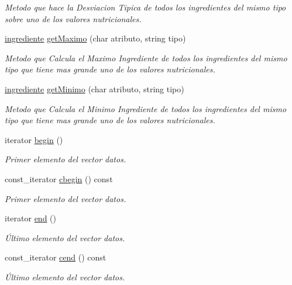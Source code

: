 \begin{DoxyCompactItemize}
\begin{DoxyCompactList}\small\item\em Metodo que hace la Desviacion Tipica de todos los ingredientes del mismo tipo sobre uno de los valores nutricionales. \end{DoxyCompactList}\item 
\hyperlink{classingrediente}{ingrediente} \hyperlink{classingredientes_a6e4cfe264fddd851ccf2f2061d6b66ce}{get\+Maximo} (char atributo, string tipo)
\begin{DoxyCompactList}\small\item\em Metodo que Calcula el Maximo Ingrediente de todos los ingredientes del mismo tipo que tiene mas grande uno de los valores nutricionales. \end{DoxyCompactList}\item 
\hyperlink{classingrediente}{ingrediente} \hyperlink{classingredientes_a0ec4fb15cad1b31709b24751abdf2067}{get\+Minimo} (char atributo, string tipo)
\begin{DoxyCompactList}\small\item\em Metodo que Calcula el Minimo Ingrediente de todos los ingredientes del mismo tipo que tiene mas grande uno de los valores nutricionales. \end{DoxyCompactList}\item 
iterator \hyperlink{classingredientes_a9d61c6347e216b9f99264982ad8e6074}{begin} ()
\begin{DoxyCompactList}\small\item\em Primer elemento del vector datos. \end{DoxyCompactList}\item 
const\+\_\+iterator \hyperlink{classingredientes_a40fdccf1fc4542ea0774a79cfc83e070}{cbegin} () const
\begin{DoxyCompactList}\small\item\em Primer elemento del vector datos. \end{DoxyCompactList}\item 
iterator \hyperlink{classingredientes_a52a01bdabf8b52426c12976badcee775}{end} ()
\begin{DoxyCompactList}\small\item\em Último elemento del vector datos. \end{DoxyCompactList}\item 
const\+\_\+iterator \hyperlink{classingredientes_a5149813ebd368e888102e69b3d9c54e8}{cend} () const
\begin{DoxyCompactList}\small\item\em Último elemento del vector datos. \end{DoxyCompactList}\end{DoxyCompactItemize}
